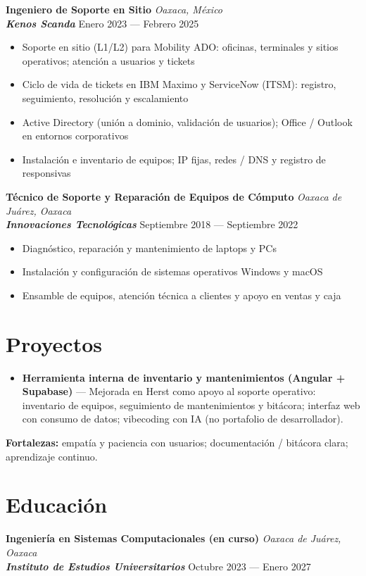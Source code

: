 \documentclass[10pt,letterpaper]{article}
\newcommand{\entry}[4]{
  \begin{minipage}[t]{\linewidth}
    \textbf{#1} \hfill \textit{#2} \\
    \textbf{\textit{#3}} \hfill #4
  \end{minipage}
}
\begin{document}
\entry
{Ingeniero de Soporte en Sitio}
{Oaxaca, México}
{Kenos Scanda}
{Enero 2023 --- Febrero 2025}
\begin{itemize}
	\item Soporte en sitio (L1/L2) para Mobility ADO: oficinas, terminales y sitios operativos; atención a usuarios y tickets
	\item Ciclo de vida de tickets en IBM Maximo y ServiceNow (ITSM): registro, seguimiento, resolución y escalamiento
	\item Active Directory (unión a dominio, validación de usuarios); Office / Outlook en entornos corporativos
	\item Instalación e inventario de equipos; IP fijas, redes / DNS y registro de responsivas
\end{itemize}

\entry
{Técnico de Soporte y Reparación de Equipos de Cómputo}
{Oaxaca de Juárez, Oaxaca}
{Innovaciones Tecnológicas}
{Septiembre 2018 --- Septiembre 2022}
\begin{itemize}
	\item Diagnóstico, reparación y mantenimiento de laptops y PCs
	\item Instalación y configuración de sistemas operativos Windows y macOS
	\item Ensamble de equipos, atención técnica a clientes y apoyo en ventas y caja
\end{itemize}

\section*{Proyectos}

\begin{itemize}
	\item \textbf{Herramienta interna de inventario y mantenimientos (Angular + Supabase)} --- Mejorada en Herst como apoyo al soporte operativo: inventario de equipos, seguimiento de mantenimientos y bitácora; interfaz web con consumo de datos; vibecoding con IA (no portafolio de desarrollador).
\end{itemize}

\textbf{Fortalezas:} empatía y paciencia con usuarios; documentación / bitácora clara; aprendizaje continuo.

\section*{Educación}

\entry
{Ingeniería en Sistemas Computacionales (en curso)}
{Oaxaca de Juárez, Oaxaca}
{Instituto de Estudios Universitarios}
{Octubre 2023 --- Enero 2027}
\end{document}
